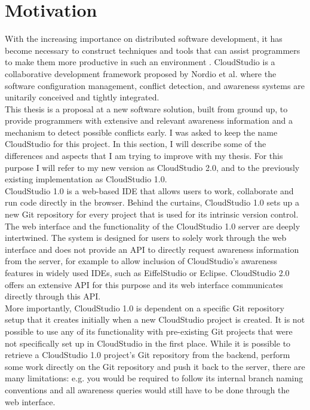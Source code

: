 \section{Motivation}




With the increasing importance on distributed software development, it has become necessary to construct techniques and tools that can assist programmers to make them more productive in such an environment \cite{ref13}. CloudStudio is a collaborative development framework proposed by Nordio et al. \cite{ref12, ref28} where the software configuration management, conflict detection, and awareness systems are unitarily conceived and tightly integrated. \\

This thesis is a proposal at a new software solution, built from ground up, to provide programmers with extensive and relevant awareness information and a mechanism to detect possible conflicts early. I was asked to keep the name CloudStudio for this project. In this section, I will describe some of the differences and aspects that I am trying to improve with my thesis. For this purpose I will refer to my new version as CloudStudio 2.0, and to the previously existing implementation as CloudStudio 1.0. \\

CloudStudio 1.0 is a web-based IDE that allows users to work, collaborate and run code directly in the browser. Behind the curtains, CloudStudio 1.0 sets up a new Git repository for every project that is used for its intrinsic version control. \\

The web interface and the functionality of the CloudStudio 1.0 server are deeply intertwined. The system is designed for users to solely work through the web interface and does not provide an API to directly request awareness information from the server, for example to allow inclusion of CloudStudio's awareness features in widely used IDEs, such as EiffelStudio \cite{eiffelstudio} or Eclipse. CloudStudio 2.0 offers an extensive API for this purpose and its web interface communicates directly through this API. \\

More importantly, CloudStudio 1.0 is dependent on a specific Git repository setup that it creates initially when a new CloudStudio project is created. It is not possible to use any of its functionality with pre-existing Git projects that were not specifically set up in CloudStudio in the first place. While it is possible to retrieve a CloudStudio 1.0 project's Git repository from the backend, perform some work directly on the Git repository and push it back to the server, there are many limitations: e.g. you would be required to follow its internal branch naming conventions and all awareness queries would still have to be done through the web interface. \\

